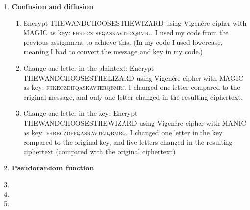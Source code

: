 \documentclass{article}
\begin{document}
	\homeworktitle
	
	\begin{enumerate}[label=\textbf{Task \arabic*:}]
		\item \textbf{Confusion and diffusion}
		\begin{enumerate}[label=\textit{Part \roman*:}]
			\item Encrypt \textsc{THEWANDCHOOSESTHEWIZARD} using Vigenére cipher with \textsc{MAGIC} as key: \textsc{fhkeczdipqaskavtecqbmrj}. I used my code from the previous assignment to achieve this. (In my code I used lowercase, meaning I had to convert the message and key in my code.)
			
			\item Change one letter in the plaintext: Encrypt \textsc{THEWANDCHOOSESTHELIZARD} using Vigenére cipher with \textsc{MAGIC} as key: \textsc{fhkeczdipqaskavterqbmrj}. I changed one letter compared to the original message, and only one letter changed in the resulting ciphertext.
			
			\item Change one letter in the key: Encrypt \textsc{THEWANDCHOOSESTHEWIZARD} using Vigenére cipher with \textsc{MANIC} as key: \textsc{fhreczdppqasravtejqbmrq}. I changed one letter in the key compared to the original key, and five letters changed in the resulting ciphertext (compared with the original ciphertext). 
			
		\end{enumerate}
		\item \textbf{Pseudorandom function}
		\item 
		\item 
		\item 
	\end{enumerate}
	
\end{document}
